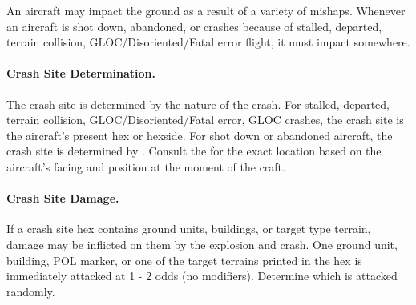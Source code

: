 \begin{advancedrules}
An aircraft may impact the ground as a result of a variety of mishaps. Whenever an aircraft is shot down, abandoned, or crashes because of stalled, departed, terrain collision, GLOC/Disoriented/Fatal error flight, it must impact somewhere.

\paragraph{Crash Site Determination.} The crash site is determined by the nature of the crash. For stalled, departed, terrain collision, GLOC/Disoriented/Fatal error, GLOC crashes, the crash site is the aircraft's present hex or hexside. For shot down or abandoned aircraft, the crash site is determined by . Consult the  for the exact location based on the aircraft's facing and position at the moment of the craft.

\paragraph{Crash Site Damage.} If a crash site hex contains ground units, buildings, or target type terrain, damage may be inflicted on them by the explosion and crash. One ground unit, building, POL marker, or one of the target terrains printed in the hex is immediately attacked at 1 - 2 odds (no modifiers). Determine which is attacked randomly.

\end{advancedrules}
